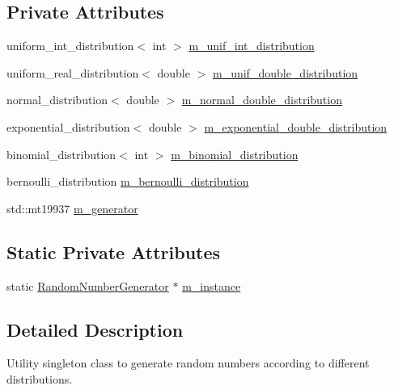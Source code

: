 \subsection*{Private Attributes}
\begin{DoxyCompactItemize}
\item 
uniform\+\_\+int\+\_\+distribution$<$ int $>$ \hyperlink{class_random_number_generator_a7a3a5b9bfbb1306f364704bc3a9860b6}{m\+\_\+unif\+\_\+int\+\_\+distribution}
\item 
uniform\+\_\+real\+\_\+distribution$<$ double $>$ \hyperlink{class_random_number_generator_ab7697a4a0f3efe902aa49828bd78f1e2}{m\+\_\+unif\+\_\+double\+\_\+distribution}
\item 
normal\+\_\+distribution$<$ double $>$ \hyperlink{class_random_number_generator_af52b8c4de45f210754524225e97279b1}{m\+\_\+normal\+\_\+double\+\_\+distribution}
\item 
exponential\+\_\+distribution$<$ double $>$ \hyperlink{class_random_number_generator_ac5c29b50fc9b914fffd34d5730a62ca7}{m\+\_\+exponential\+\_\+double\+\_\+distribution}
\item 
binomial\+\_\+distribution$<$ int $>$ \hyperlink{class_random_number_generator_a0669afa8b2ad0fd544f140e294ce581f}{m\+\_\+binomial\+\_\+distribution}
\item 
bernoulli\+\_\+distribution \hyperlink{class_random_number_generator_ae0cd7e84eca4dba3ba65902ffff61e96}{m\+\_\+bernoulli\+\_\+distribution}
\item 
std\+::mt19937 \hyperlink{class_random_number_generator_a2fd6f5958a3c4500beee344d6af66a39}{m\+\_\+generator}
\end{DoxyCompactItemize}
\subsection*{Static Private Attributes}
\begin{DoxyCompactItemize}
\item 
static \hyperlink{class_random_number_generator}{Random\+Number\+Generator} $\ast$ \hyperlink{class_random_number_generator_a4b1f72cf7dbba86ac83bff4f9f496de3}{m\+\_\+instance}
\end{DoxyCompactItemize}


\subsection{Detailed Description}
Utility singleton class to generate random numbers according to different distributions. 

